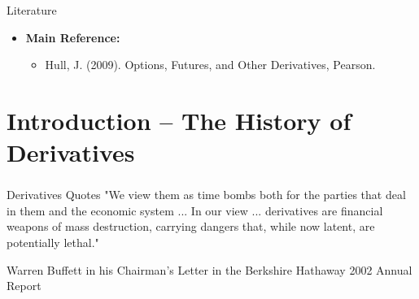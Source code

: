 
\begin{frame}
    \frametitle{}
\vspace{0cm}
\begin{center}
\end{center}
\end{frame}


{Literature}
\begin{itemize}
\item \textbf{Main Reference:}
\begin{itemize}
\item Hull, J. (2009). Options, Futures, and Other Derivatives, Pearson.
\end{itemize}
\end{itemize}



\section{Introduction -- The History of Derivatives}

\begin{frame}
    \frametitle{}
\vspace{0cm}
\begin{center}
\end{center}
\end{frame}


{Derivatives Quotes}
"We view them as time bombs both for the parties that deal in them and the economic system ... In our view ... derivatives are financial weapons of mass destruction, carrying dangers that, while now latent, are potentially lethal."
\begin{flushright}
  \begin{footnotesize}
  Warren Buffett in his Chairman's Letter in the Berkshire Hathaway 2002 Annual Report
 \end{footnotesize}
\end{flushright}



